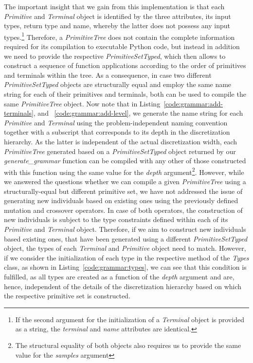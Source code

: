 The important insight that we gain from this implementation is that each \emph{Primitive} and \emph{Terminal} object is identified by the three attributes, its input types, return type and name, whereby the latter does not possess any input types.\footnote{If the second argument for the initialization of a \emph{Terminal} object is provided as a string, the \emph{terminal} and \emph{name} attributes are identical.}
Therefore, a \emph{PrimitiveTree} does not contain the complete information required for its compilation to executable Python code, but instead in addition we need to provide the respective \emph{PrimitiveSetTyped}, which then allows to construct a sequence of function applications according to the order of primitives and terminals within the tree.  
As a consequence, in case two different \emph{PrimitiveSetTyped} objects are structurally equal and employ the same name string for each of their primitives and terminals, both can be used to compile the same \emph{PrimitiveTree} object.
Now note that in Listing~\ref{code:grammar:add-terminals}, and ~\ref{code:grammar:add-level}, we generate the name string for each \emph{Primitive} and \emph{Terminal} using the problem-independent naming convention together with a subscript that corresponds to its depth in the discretization hierarchy.
As the latter is independent of the actual discretization width, each \emph{PrimitiveTree} generated based on a \emph{PrimitiveSetTyped} object returned by our \emph{generate\_grammar} function can be compiled with any other of those constructed with this function using the same value for the \emph{depth} argument\footnote{The structural equality of both objects also requires us to provide the same value for the \emph{samples} argument}.
However, while we answered the questions whether we can compile a given \emph{PrimitiveTree} using a structurally-equal but different primitive set, we have not addressed the issue of generating new individuals based on existing ones using the previously defined mutation and crossover operators.
In case of both operators, the construction of new individuals is subject to the type constraints defined within each of its \emph{Primitive} and \emph{Terminal} object.
Therefore, if we aim to construct new individuals based existing ones, that have been generated using a different \emph{PrimitiveSetTyped} object, the types of each \emph{Terminal} and \emph{Primitive} object need to match.
However, if we consider the initialization of each type in the respective method of the \emph{Types} class, as shown in Listing~\ref{code:grammar:types}, we can see that this condition is fulfilled, as all types are created as a function of the \emph{depth} argument and are, hence, independent of the details of the discretization hierarchy based on which the respective primitive set is constructed.
